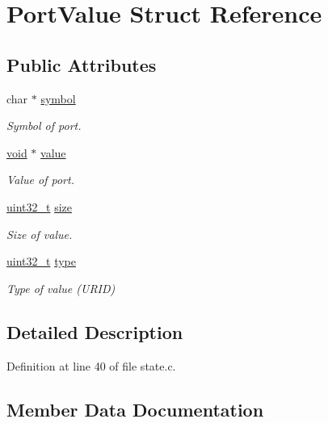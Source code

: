 \hypertarget{struct_port_value}{}\section{Port\+Value Struct Reference}
\label{struct_port_value}
\subsection*{Public Attributes}
\begin{DoxyCompactItemize}
\item 
char $\ast$ \hyperlink{struct_port_value_a3ac36f51d2c4632361b39449834ff6e4}{symbol}
\begin{DoxyCompactList}\small\item\em Symbol of port. \end{DoxyCompactList}\item 
\hyperlink{sound_8c_ae35f5844602719cf66324f4de2a658b3}{void} $\ast$ \hyperlink{struct_port_value_a40b3052f3bf8c4e44b9d005543b765a4}{value}
\begin{DoxyCompactList}\small\item\em Value of port. \end{DoxyCompactList}\item 
\hyperlink{lib-src_2ffmpeg_2win32_2stdint_8h_a6eb1e68cc391dd753bc8ce896dbb8315}{uint32\+\_\+t} \hyperlink{struct_port_value_a93a9aa1527ec35923e040a3c63f2231f}{size}
\begin{DoxyCompactList}\small\item\em Size of value. \end{DoxyCompactList}\item 
\hyperlink{lib-src_2ffmpeg_2win32_2stdint_8h_a6eb1e68cc391dd753bc8ce896dbb8315}{uint32\+\_\+t} \hyperlink{struct_port_value_a34915942cf7128ad04d42ae42b1cc81e}{type}
\begin{DoxyCompactList}\small\item\em Type of value (U\+R\+ID) \end{DoxyCompactList}\end{DoxyCompactItemize}


\subsection{Detailed Description}


Definition at line 40 of file state.\+c.



\subsection{Member Data Documentation}
